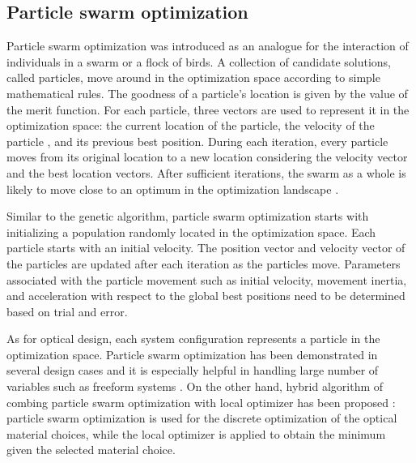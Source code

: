 \subsection{Particle swarm optimization}
Particle swarm optimization was introduced as an analogue for the interaction of individuals in a swarm or a flock of birds. A collection of candidate solutions, called particles, move around in the optimization space according to simple mathematical rules. The goodness of a particle's location is given by the value of the merit function. For each particle, three vectors are used to represent it in the optimization space: the current location of the particle, the velocity of the particle , and its previous best position. During each iteration, every particle moves from its original location to a new location considering the velocity vector and the best location vectors.  After sufficient iterations, the swarm as a whole is likely to move close to an optimum in the optimization landscape \cite{MenkeParticleSwarm} . 

Similar to the genetic algorithm, particle swarm optimization starts with initializing a population randomly located in the optimization space. Each particle starts with an initial velocity. The position vector and velocity vector of the particles are updated after each iteration as the particles move. Parameters associated with the particle movement such as initial velocity, movement inertia, and acceleration with respect to the global best positions need to be determined based on trial and error. 

As for optical design, each system configuration represents a particle in the optimization space. Particle swarm optimization has been demonstrated in several design cases and it is especially helpful in handling large number of variables such as freeform systems \cite{MenkeParticleSwarm}. On the other hand, hybrid algorithm of combing particle swarm optimization with local optimizer has been proposed \cite{Guo:sParticleSwarm}: particle swarm optimization is used for the discrete optimization of the optical material choices, while the local optimizer is applied to obtain the minimum given the selected material choice.  

